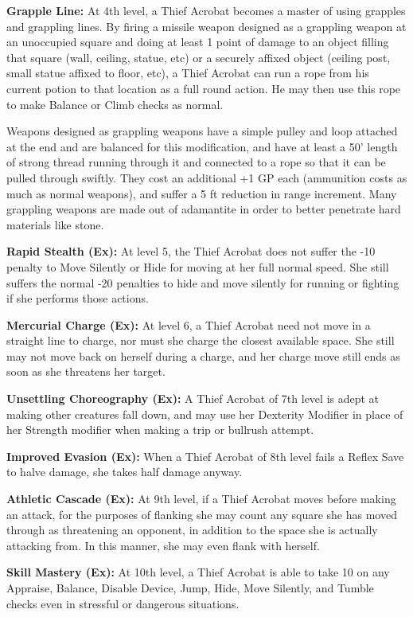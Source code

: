 \documentclass[10pt]{article}
\newcommand{\ability}[2]{\smallskip \noindent \textbf{#1} #2}
\begin{document}
\ability{Grapple Line:}{At 4th level, a Thief Acrobat becomes a master of using grapples and grappling lines. By firing a missile weapon designed as a grappling weapon at an unoccupied square and doing at least 1 point of damage to an object filling that square (wall, ceiling, statue, etc) or a securely affixed object (ceiling post, small statue affixed to floor, etc), a Thief Acrobat can run a rope from his current potion to that location as a full round action. He may then use this rope to make Balance or Climb checks as normal.

Weapons designed as grappling weapons have a simple pulley and loop attached at the end and are balanced for this modification, and have at least a 50' length of strong thread running through it and connected to a rope so that it can be pulled through swiftly. They cost an additional +1 GP each (ammunition costs as much as normal weapons), and suffer a 5 ft reduction in range increment. Many grappling weapons are made out of adamantite in order to better penetrate hard materials like stone.}

\ability{Rapid Stealth (Ex):}{At level 5, the Thief Acrobat does not suffer the -10 penalty to Move Silently or Hide for moving at her full normal speed. She still suffers the normal -20 penalties to hide and move silently for running or fighting if she performs those actions.}

\ability{Mercurial Charge (Ex):}{At level 6, a Thief Acrobat need not move in a straight line to charge, nor must she charge the closest available space. She still may not move back on herself during a charge, and her charge move still ends as soon as she threatens her target.}

\ability{Unsettling Choreography (Ex):}{A Thief Acrobat of 7th level is adept at making other creatures fall down, and may use her Dexterity Modifier in place of her Strength modifier when making a trip or bullrush attempt.}

\ability{Improved Evasion (Ex):}{When a Thief Acrobat of 8th level fails a Reflex Save to halve damage, she takes half damage anyway.}

\ability{Athletic Cascade (Ex):}{At 9th level, if a Thief Acrobat moves before making an attack, for the purposes of flanking she may count any square she has moved through as threatening an opponent, in addition to the space she is actually attacking from. In this manner, she may even flank with herself.}

\ability{Skill Mastery (Ex):}{At 10th level, a Thief Acrobat is able to take 10 on any Appraise, Balance, Disable Device, Jump, Hide, Move Silently, and Tumble checks even in stressful or dangerous situations.}
\end{document}
